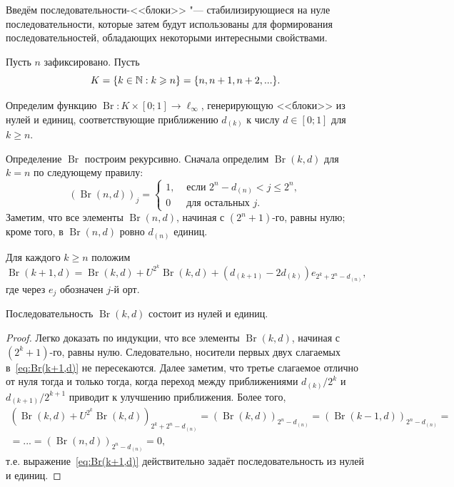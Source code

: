 Введём последовательности-<<блоки>> "---
стабилизирующиеся на нуле последовательности,
которые затем будут использованы для формирования последовательностей,
обладающих некоторыми интересными свойствами.

Пусть $n$ зафиксировано.
Пусть
\begin{equation}
	K = \{k\in\mathbb{N} : k \geqslant n\} = \{n, n+1, n+2, ...\}
	.
\end{equation}


Определим функцию $\operatorname{Br}:K\times [0;1] \to \ell_\infty$,
генерирующую <<блоки>> из нулей и единиц,
соответствующие приближению $d_{(k)}$ к числу $d\in[0;1]$ для $k \geq n$.

Определение $\operatorname{Br}$ построим рекурсивно.
Сначала определим $\operatorname{Br}(k,d)$ для $k=n$ по следующему правилу:
\begin{equation}
	(\operatorname{Br}(n,d))_j = \begin{cases}
		1, & \mbox{~если~} 2^n - d_{(n)} < j \leq 2^n,
		\\
		0  & \mbox{~для остальных~} j
		.
	\end{cases}
\end{equation}
Заметим, что все элементы $\operatorname{Br}(n,d)$, начиная с $(2^n+1)$-го, равны нулю;
кроме того, в $\operatorname{Br}(n,d)$ ровно $d_{(n)}$ единиц.

Для каждого $k \geq n$ положим
\begin{equation}
	\label{eq:Br(k+1,d)}
	\operatorname{Br}(k+1,d) = \operatorname{Br}(k,d) + U^{2^k}\operatorname{Br}(k,d) + (d_{(k+1)}-2d_{(k)})e_{2^k+2^n-d_{(n)}}
	,
\end{equation}
где через $e_j$ обозначен $j$-й орт.


\begin{proposition}
	\label{prop:Br_k_c_0_1}
	Последовательность $\operatorname{Br}(k,d)$ состоит из нулей и единиц.
\end{proposition}
\begin{proof}
	Легко доказать по индукции, что все элементы $\operatorname{Br}(k,d)$, начиная с $(2^k+1)$-го, равны нулю.
	Следовательно, носители первых двух слагаемых в~\eqref{eq:Br(k+1,d)} не пересекаются.
	Далее заметим, что третье слагаемое отлично от нуля тогда и только тогда,
	когда переход между приближениями $d_{(k)} / 2^k$ и $d_{(k+1)}/2^{k+1}$
	приводит к улучшению приближения.
	Более того,
	\begin{multline}
		\left(\operatorname{Br}(k,d) + U^{2^k}\operatorname{Br}(k,d)\right)_{2^k+2^n-d_{(n)}}
		=
		(\operatorname{Br}(k,d))_{2^n-d_{(n)}}
		=
		(\operatorname{Br}(k-1,d))_{2^n-d_{(n)}}
		=
		\\=
		...
		=
		(\operatorname{Br}(n,d))_{2^n-d_{(n)}}
		=
		0
		,
	\end{multline}
	т.е. выражение~\eqref{eq:Br(k+1,d)} действительно задаёт последовательность из нулей и единиц.
\end{proof}

